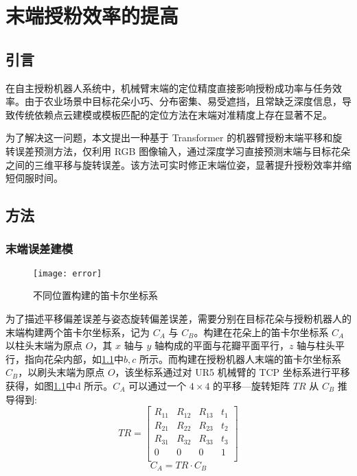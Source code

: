 
\chapter{末端授粉效率的提高}\label{ch:6}
\section{引言}

在自主授粉机器人系统中，机械臂末端的定位精度直接影响授粉成功率与任务效率。由于农业场景中目标花朵小巧、分布密集、易受遮挡，且常缺乏深度信息，导致传统依赖点云建模或模板匹配的定位方法在末端对准精度上存在显著不足。

为了解决这一问题，本文提出一种基于 Transformer 的机器臂授粉末端平移和旋转误差预测方法，仅利用 RGB 图像输入，通过深度学习直接预测末端与目标花朵之间的三维平移与旋转误差。该方法可实时修正末端位姿，显著提升授粉效率并缩短伺服时间。

\section{方法}

\subsection{末端误差建模}
\begin{figure}[htb]
	\texttt{[image: error]}
	\caption[不同位置构建的笛卡尔坐标系]{不同位置构建的笛卡尔坐标系} %
	\label{fig:effective1}
\end{figure}


为了描述平移偏差误差与姿态旋转偏差误差，需要分别在目标花朵与授粉机器人的末端构建两个笛卡尔坐标系，记为 $C_{A}$ 与 $C_{B}$。构建在花朵上的笛卡尔坐标系 $C_{A}$ 以柱头末端为原点 $O$，其 $x$ 轴与 $y$ 轴构成的平面与花瓣平面平行，$z$ 轴与柱头平行，指向花朵内部，如\cref{fig:effective1}中$b,c$ 所示。而构建在授粉机器人末端的笛卡尔坐标系 $C_{B}$，以刷头末端为原点 $O$，该坐标系通过对 UR5 机械臂的 TCP 坐标系进行平移获得，如图\cref{fig:effective1}中d 所示。$C_{A}$ 可以通过一个 $4\times4$ 的平移—旋转矩阵 $TR$ 从 $C_{B}$ 推导得到:
\begin{equation}
	\label{eq0_1}
	TR=
	\begin{bmatrix}
		R_{11} & R_{12} & R_{13} & t_{1} \\
		R_{21} & R_{22} & R_{23} & t_{2} \\
		R_{31} & R_{32} & R_{33} & t_{3} \\
		0 & 0 & 0 & 1 \\
	\end{bmatrix}
\end{equation}
\begin{equation}
	\label{eq0_2}
	C_{A} = TR\cdot C_{B}
\end{equation}

